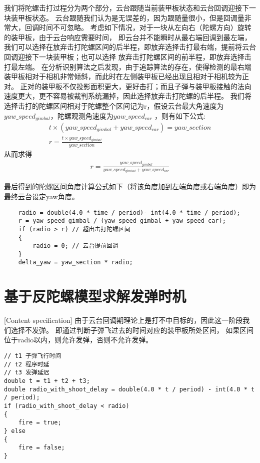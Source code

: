 我们将陀螺击打过程分为两个部分，云台跟随当前装甲板状态和云台回调迎接下一块装甲板状态。
云台跟随我们认为是无误差的，因为跟随量很小，但是回调量非常大，回调时间不可忽略。
考虑如下情况，对于一块从左向右（陀螺方向）旋转的装甲板，由于云台响应需要时间，
即云台并不能瞬时从最右端回调到最左端，
我们可以选择在放弃击打陀螺区间的后半程，即放弃选择击打最右端，提前将云台回调迎接下一块装甲板；也可以选择
放弃击打陀螺区间的前半程，即放弃选择击打最左端。
在分析识别算法之后发现，由于追踪算法的存在，使得检测的最右端装甲板相对于相机非常倾斜，而此时在左侧装甲板已经出现且相对于相机较为正对。
正对的装甲板不仅投影面积更大，更好击打；而且子弹与装甲板接触的法向速度更大，更不容易被裁判系统漏掉，因此选择放弃击打陀螺的后半程。
我们将选择击打的陀螺区间相对于陀螺整个区间记为r，假设云台最大角速度为$yaw\_speed_{gimbal}$，陀螺观测角速度为$yaw\_speed_{car}$
，则有如下公式:
\begin{gather}
    t  \times (yaw\_speed_{gimbal} + yaw\_speed_{car}) = yaw\_section \\
    r = \frac{t \times yaw\_speed_{gimbal} }{yaw\_section}
\end{gather}
从而求得
\begin{gather}
    r = \frac{yaw\_speed_{gimbal}}{yaw\_speed_{gimbal} + yaw\_speed_{car}}
\end{gather}

最后得到的陀螺区间角度计算公式如下（将该角度加到左端角度或右端角度）即为最终云台设定yaw角度。
\begin{lstlisting}
    radio = double(4.0 * time / period)- int(4.0 * time / period);
    r = yaw_speed_gimbal / (yaw_speed_gimbal + yaw_speed_car);
    if (radio > r) // 超出击打陀螺区间
    {
        radio = 0; // 云台提前回调
    }
    delta_yaw = yaw_section * radio;
\end{lstlisting}

\section{基于反陀螺模型求解发弹时机}[Content specification]
由于云台回调期理论上是打不中目标的，因此这一阶段我们选择不发弹。
即通过判断子弹飞过去的时间对应的装甲板所处区间，
如果区间位于radio以内，则允许发弹，否则不允许发弹。
\begin{lstlisting}
// t1 子弹飞行时间
// t2 程序时延
// t3 发弹延迟
double t = t1 + t2 + t3;
double radio_with_shoot_delay = double(4.0 * t / period) - int(4.0 * t / period);
if (radio_with_shoot_delay < radio)
{
    fire = true;
} else
{
    fire = false;
}
\end{lstlisting}




